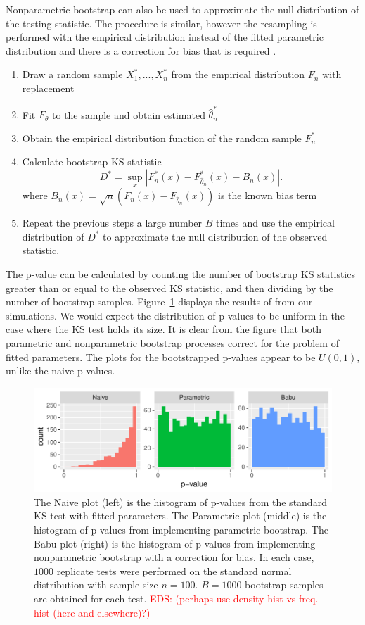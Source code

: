 \documentclass[12pt, letterpaper, titlepage]{article}
\newcommand{\eds}[1]{\textcolor{red}{EDS: (#1)}}
\begin{document}
Nonparametric bootstrap can also be used to approximate the null distribution 
of the testing statistic. The procedure is similar, however the resampling is 
performed with the empirical distribution instead of the fitted parametric
distribution and there is a correction for bias that is required
\citep{Babu}.
\begin{enumerate}
  \item 
    Draw a random sample $X_1^*,...,X_n^*$ from the empirical distribution $F_n$
    with replacement
  \item 
    Fit $F_\theta$ to the sample and obtain estimated $\hat\theta_n^*$
  \item
    Obtain the empirical distribution function of the random sample $F_n^*$
  \item 
    Calculate bootstrap KS statistic
    \[
      D^* = \sup_x | F_n^* (x)- F_{\hat\theta_n}^*(x) - B_n(x) |.
    \]
    where $B_{n}(x) = \sqrt{n}(F_{n}(x) - F_{\hat\theta_n}(x))$ is the known 
    bias term \citep{Babu}
  \item
    Repeat the previous steps a large number $B$ times and use the empirical 
    distribution of $D^*$ to approximate the null distribution of the observed 
    statistic.
\end{enumerate}
The p-value can be calculated by counting the number of bootstrap KS 
statistics greater than or equal to the observed KS statistic, and then dividing 
by the number of bootstrap samples. Figure~\ref{fig:hist_fitted} displays the 
results of from our simulations. We would expect the distribution of p-values 
to be uniform in the case where the KS test holds its size. It is clear from the 
figure that both parametric and nonparametric bootstrap processes correct for 
the problem of fitted parameters. The plots for the bootstrapped p-values appear
to be $U(0,1)$, unlike the naive p-values.

\begin{figure}[tbp]
  \centering
  \includegraphics[width=\textwidth]{hist_fitted}
  \caption{The Naive plot (left) is the histogram of p-values from the standard 
  KS test with fitted parameters. The Parametric plot (middle) is the histogram
  of p-values from implementing parametric bootstrap. The Babu plot (right) is 
  the histogram of p-values from implementing nonparametric bootstrap with a 
  correction for bias. In each case, $1000$ replicate tests were performed on 
  the standard normal distribution with sample size $n = 100$. $B = 1000$ 
  bootstrap samples are obtained for each test. \eds{perhaps use density hist vs
	freq. hist (here and elsewhere)?}}
  \label{fig:hist_fitted}
\end{figure}
\end{document}
